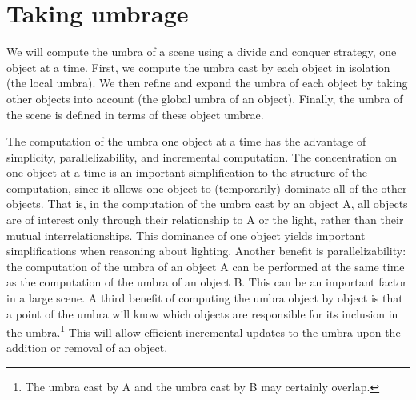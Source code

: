 \documentclass[9pt,twocolumn]{article}
\newif\ifTalk
\begin{document}
\ifTalk
This distinction between point and regional approaches is analogous to the 
two ways for computing a tangent on a Bezier curve:
computing the tangent at a point
or computing the hodograph of the curve, representing all of the tangents.)
\fi


\clearpage


\clearpage

\section{Taking umbrage} %

We will compute the umbra of a scene using a divide and conquer strategy,
one object at a time.
First, we compute the umbra cast by each object in isolation
(the local umbra).
We then refine and expand the umbra of each object
by taking other objects into account (the global umbra of an object).
Finally, the umbra of the scene is defined in terms of these object umbrae.

The computation of the umbra one object at a time has the advantage
of simplicity, parallelizability, and incremental computation.
The concentration on one object at a time is
an important simplification to the structure of the computation,
since it allows one object to (temporarily) dominate all of the other objects.
That is, in the computation of the umbra cast by an object A, 
all objects are of interest only through their relationship
to A or the light, rather than their mutual interrelationships.
This dominance of one object yields important simplifications when
reasoning about lighting.
Another benefit is parallelizability:
the computation of the umbra of an object A can be performed at the same
time as the computation of the umbra of an object B.
This can be an important factor in a large scene.
A third benefit of computing the umbra object by object
is that a point of the umbra will know which objects are
responsible for its inclusion in the umbra.\footnote{The umbra cast by 
	A and the umbra cast by B may certainly overlap.}
This will allow efficient incremental updates to the umbra upon the addition
or removal of an object.
\end{document}
